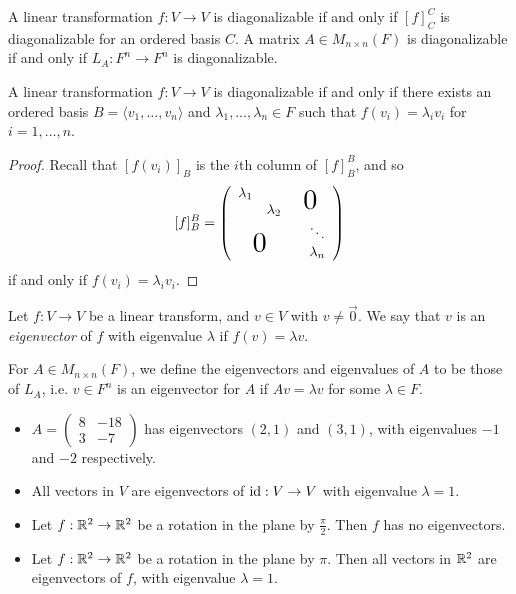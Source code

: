 \begin{rmk}
    A linear transformation $f: V \to V$ is diagonalizable if and only if $[f]_C^C$ is diagonalizable for an ordered basis $C$. A matrix $A \in M_{n \times n}(F)$ is diagonalizable if and only if $L_A: F^n \to F^n$ is diagonalizable.
\end{rmk}

\begin{lemma}\label{diagonalizable-eigenvectors}
    A linear transformation $f: V \to V$ is diagonalizable if and only if there exists an ordered basis $B = \langle v_1, \ldots, v_n\rangle$ and $\lambda_1, \ldots, \lambda_n \in F$ such that $f(v_i) = \lambda_iv_i$ for $i = 1, \ldots, n$.
\end{lemma}

\begin{proof}
    Recall that $[f(v_i)]_{B}$ is the $i$th column of $[f]_{B}^{B}$, and so
    \[[f]_{B}^{B} = \left(\begin{array}{cccc}
        \lambda_1 & & \largeblock{2}{-0.7}{0} \\
        & \lambda_2 & &  \\
        & & & \ddots \\
        \largeblock{2}{0.7}{0} & & \lambda_n \\
    \end{array}
    \right)\] if and only if $f(v_i) = \lambda_iv_i$.
\end{proof}

\begin{defn}
    Let $f: V \to V$ be a linear transform, and $v \in V$ with $v \neq \vec{0}$. We say that $v$ is an \emph{eigenvector} of $f$ with eigenvalue $\lambda$ if $f(v) = \lambda v$.

    For $A \in M_{n \times n}(F)$, we define the eigenvectors and eigenvalues of $A$ to be those of $L_A$, i.e. $v \in F^n$ is an eigenvector for $A$ if $Av = \lambda v$ for some $\lambda \in F$.
\end{defn}

\begin{exmp}\proofbreak
    \begin{itemize}
        \item $A = \begin{pmatrix}8 & -18 \\ 3 & -7\end{pmatrix}$ has eigenvectors $(2, 1)$ and $(3, 1)$, with eigenvalues $-1$ and $-2$ respectively.
        \item All vectors in $V$ are eigenvectors of $\operatorname{id}: V \to V$ with eigenvalue $\lambda = 1$.
        \item Let $f: \mathbb{R}^2 \to \mathbb{R}^2$ be a rotation in the plane by $\frac{\pi}{2}$. Then $f$ has no eigenvectors.
        \item Let $f: \mathbb{R}^2 \to \mathbb{R}^2$ be a rotation in the plane by $\pi$. Then all vectors in $\mathbb{R}^2$ are eigenvectors of $f$, with eigenvalue $\lambda = 1$.
    \end{itemize}
\end{exmp}

